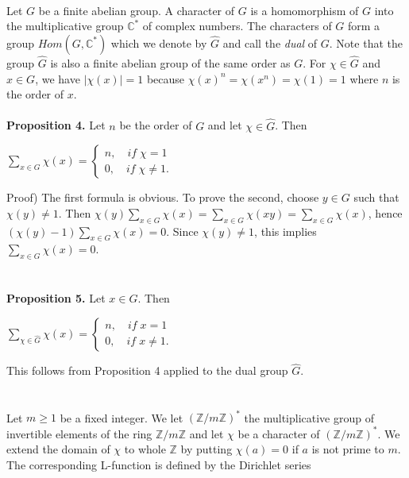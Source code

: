 \documentclass[11pt]{article}
\begin{document}
\\
Let $G$ be a finite abelian group. A character of $G$ is a homomorphism of $G$ into the multiplicative group $\mathbb{C}^*$ of complex numbers. The characters of $G$ form a group $Hom(G,\mathbb{C}^*)$ which we denote by $\hat{G}$ and call the \textit{dual} of $G$. Note that the group $\hat{G}$ is also a finite abelian group of the same order as $G$. For $\chi\in\hat{G}$ and $x\in G$, we have $|\chi(x)|=1$ because $\chi(x)^n=\chi(x^n)=\chi(1)=1$ where $n$ is the order of $x$.
\\
\\
\textbf{Proposition 4.}
Let $n$ be the order of $G$ and let $\chi\in\hat{G}$. Then
\begin{center}
    $\displaystyle\sum_{x\in G} \chi(x)=\left \{\begin{array}{l}
    n,\quad if \; \chi=1 \\
    0,\quad if \; \chi\neq 1.
    \end{array}
    \right.$
\end{center}
Proof) The first formula is obvious. To prove the second, choose $y\in G$ such that $\chi(y)\neq 1$. Then $\chi(y)\displaystyle\sum_{x\in G} \chi(x)=\displaystyle\sum_{x\in G} \chi(xy)=\displaystyle\sum_{x\in G} \chi(x)$, hence $(\chi(y)-1)\displaystyle\sum_{x\in G} \chi(x)=0$. Since $\chi(y)\neq 1$, this implies $\displaystyle\sum_{x\in G} \chi(x)=0$.
\\
\\
\\
\textbf{Proposition 5.}
Let $x \in G$. Then
\begin{center}
    $\displaystyle\sum_{\chi\in \hat{G}} \chi(x)=\left \{\begin{array}{l}
    n,\quad if \; x=1 \\
    0,\quad if \; x\neq 1.
    \end{array}
    \right.$
\end{center}
This follows from Proposition 4 applied to the dual group $\hat{G}$.
\\
\\
\\
Let $m\geq 1$ be a fixed integer. We let $(\mathbb{Z}/m\mathbb{Z})^*$ the multiplicative group of invertible elements of the ring $\mathbb{Z}/m\mathbb{Z}$ and let $\chi$ be a character of $(\mathbb{Z}/m\mathbb{Z})^*$. We extend the domain of $\chi$ to whole $\mathbb{Z}$ by putting $\chi(a)=0$ if $a$ is not prime to $m$.\\
The corresponding L-function is defined by the Dirichlet series
\end{document}
